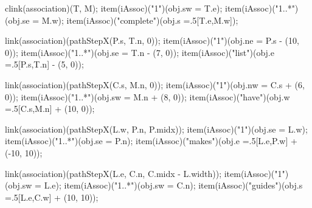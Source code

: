 \begin{empfile}
\begin{empdef}[erdiag]
clink(association)(T, M);
item(iAssoc)("1")(obj.sw = T.e);
item(iAssoc)("1..*")(obj.se = M.w);
item(iAssoc)("complete")(obj.s =.5[T.e,M.w]);

link(association)(pathStepX(P.s, T.n, 0));
item(iAssoc)("1")(obj.ne = P.s - (10, 0));
item(iAssoc)("1..*")(obj.se = T.n - (7, 0));
item(iAssoc)("list")(obj.e =.5[P.s,T.n] - (5, 0));

link(association)(pathStepX(C.s, M.n, 0));
item(iAssoc)("1")(obj.nw = C.s + (6, 0));
item(iAssoc)("1..*")(obj.sw = M.n + (8, 0));
item(iAssoc)("have")(obj.w =.5[C.s,M.n] + (10, 0));

link(association)(pathStepX(L.w, P.n, P.midx));
item(iAssoc)("1")(obj.se = L.w);
item(iAssoc)("1..*")(obj.se = P.n);
item(iAssoc)("makes")(obj.e =.5[L.e,P.w] + (-10, 10));

link(association)(pathStepX(L.e, C.n, C.midx - L.width));
item(iAssoc)("1")(obj.sw = L.e);
item(iAssoc)("1..*")(obj.sw = C.n);
item(iAssoc)("guides")(obj.s =.5[L.e,C.w] + (10, 10));

\end{empdef}

\end{empfile}